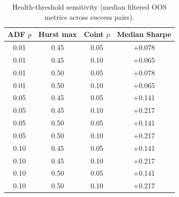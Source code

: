 \begin{table}[t]
\centering
\caption{Health-threshold sensitivity (median filtered OOS metrics across success pairs).}
\label{tab:health_threshold_sensitivity}
\small
\begin{tabular}{cccc}
\hline
\textbf{ADF $p$} & \textbf{Hurst max} & \textbf{Coint $p$} & \textbf{Median Sharpe} \\
\hline
0.01 & 0.45 & 0.05 & +0.078 \\
0.01 & 0.45 & 0.10 & +0.065 \\
0.01 & 0.50 & 0.05 & +0.078 \\
0.01 & 0.50 & 0.10 & +0.065 \\
0.05 & 0.45 & 0.05 & +0.141 \\
0.05 & 0.45 & 0.10 & +0.217 \\
0.05 & 0.50 & 0.05 & +0.141 \\
0.05 & 0.50 & 0.10 & +0.217 \\
0.10 & 0.45 & 0.05 & +0.141 \\
0.10 & 0.45 & 0.10 & +0.217 \\
0.10 & 0.50 & 0.05 & +0.141 \\
0.10 & 0.50 & 0.10 & +0.217 \\
\hline
\end{tabular}
\end{table}
